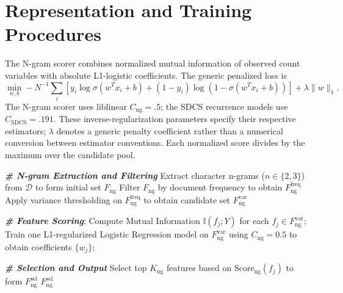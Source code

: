 \documentclass[10pt]{article}
\newenvironment{bluechange}{\color{black}}{}
\begin{document}
\section{Representation and Training Procedures}
\begin{bluechange}
The N-gram scorer combines normalized mutual information of observed count variables with absolute L1-logistic coefficients. The generic penalized loss is
\[
\min_{w,b}-N^{-1}\sum_i[y_i\log\sigma(w^Tx_i+b)+(1-y_i)\log(1-\sigma(w^Tx_i+b))]+\lambda\|w\|_1.
\]
The N-gram scorer uses liblinear $C_{\mathrm{ng}}=.5$; the SDCS recurrence models use $C_{\mathrm{SDCS}}=.191$. These inverse-regularization parameters specify their respective estimators; $\lambda$ denotes a generic penalty coefficient rather than a numerical conversion between estimator conventions. Each normalized score divides by the maximum over the candidate pool.
\begin{algorithm}[!t]
\footnotesize
\caption{N-gram Feature Selection}
\label{alg:ngram}
\DontPrintSemicolon
{}


\emph{\textbf{\# N-gram Extraction and Filtering}}\;
Extract character n-grams ($n \in \{2, 3\}$) from $\mathcal{D}$ to form initial set $F_{\text{ng}}$\;
Filter $F_{\text{ng}}$ by document frequency to obtain $F_{\text{ng}}^{\text{freq}}$\;
Apply variance thresholding on $F_{\text{ng}}^{\text{freq}}$ to obtain candidate set $F_{\text{ng}}^{\text{var}}$\;

\vspace{0.2cm}
\emph{\textbf{\# Feature Scoring}};
Compute Mutual Information $\mathbb{I}(f_j; Y)$ for each $f_j \in F_{\text{ng}}^{\text{var}}$;
Train one L1-regularized Logistic Regression model on $F_{\text{ng}}^{\text{var}}$ using $C_{\mathrm{ng}}=0.5$ to obtain coefficients $\{w_j\}$;

\vspace{0.2cm}
\emph{\textbf{\# Selection and Output}}\;
Select top $K_{\text{ng}}$ features based on $\text{Score}_{\text{ng}}(f_j)$ to form $F_{\text{ng}}^{\text{sel}}$\;
\KwRet $F_{\text{ng}}^{\text{sel}}$\;
\end{algorithm}
\begin{algorithm}[!t]
\footnotesize
\caption{Model Training}
\label{alg:focal_lgbm}
\DontPrintSemicolon
{}


\end{algorithm}
\end{bluechange}
\end{document}
